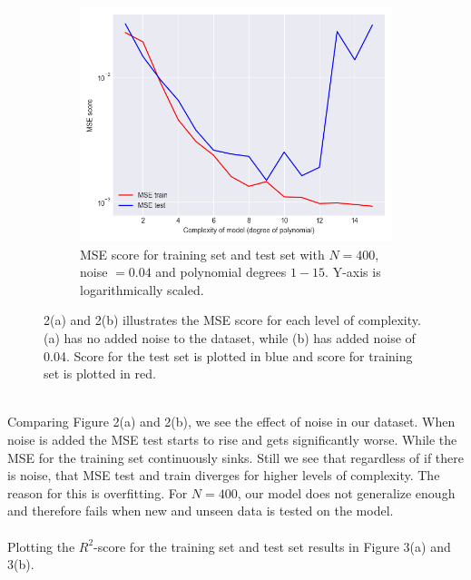 \documentclass[a4paper,twocolumn]{article}
\begin{document}
\begin{figure}[ht]
    \begin{subfigure}[b]{0.9\columnwidth}
        \includegraphics[width=\columnwidth]{mse_vs_complexity_N=400_Noise=0.04_Degree=1-15.png}
        \caption{MSE score for training set and test set with $N = 400$, noise $= 0.04$ and polynomial degrees $1-15$. Y-axis is logarithmically scaled.}
    \end{subfigure}
    \caption{2(a) and 2(b) illustrates the MSE score for each level of complexity. (a) has no added noise to the dataset, while (b) has added noise of 0.04. Score for the test set is plotted in blue and score for training set is plotted in red.}
\end{figure}\\
\noindent Comparing Figure 2(a) and 2(b), we see the effect of noise in our dataset. When noise is added the MSE test starts to rise and gets significantly worse. While the MSE for the training set continuously sinks. Still we see that regardless of if there is noise, that MSE test and train diverges for higher levels of complexity. The reason for this is overfitting. For $N=400$, our model does not generalize enough and therefore fails when new and unseen data is tested on the model.\\
\\
Plotting the $R^{2}$-score for the training set and test set results in Figure 3(a) and 3(b).
\end{document}

